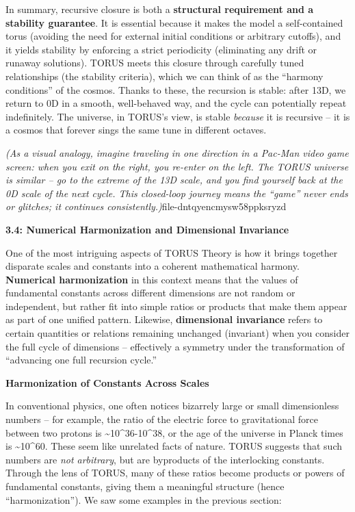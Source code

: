 \documentclass[
]{article}
\begin{document}
In summary, recursive closure is both a \textbf{structural requirement
and a stability guarantee}. It is essential because it makes the model a
self-contained torus (avoiding the need for external initial conditions
or arbitrary cutoffs), and it yields stability by enforcing a strict
periodicity (eliminating any drift or runaway solutions). TORUS meets
this closure through carefully tuned relationships (the stability
criteria), which we can think of as the ``harmony conditions'' of the
cosmos. Thanks to these, the recursion is stable: after 13D, we return
to 0D in a smooth, well-behaved way, and the cycle can potentially
repeat indefinitely. The universe, in TORUS's view, is stable
\emph{because} it is recursive -- it is a cosmos that forever sings the
same tune in different octaves.

\emph{(As a visual analogy, imagine traveling in one direction in a
Pac-Man video game screen: when you exit on the right, you re-enter on
the left. The TORUS universe is similar -- go to the extreme of the 13D
scale, and you find yourself back at the 0D scale of the next cycle.
This closed-loop journey means the ``game'' never ends or glitches; it
continues consistently.)}\hspace{0pt}file-dntqyencmysw58ppksryzd

\textbf{3.4: Numerical Harmonization and Dimensional Invariance}

One of the most intriguing aspects of TORUS Theory is how it brings
together disparate scales and constants into a coherent mathematical
harmony. \textbf{Numerical harmonization} in this context means that the
values of fundamental constants across different dimensions are not
random or independent, but rather fit into simple ratios or products
that make them appear as part of one unified pattern. Likewise,
\textbf{dimensional invariance} refers to certain quantities or
relations remaining unchanged (invariant) when you consider the full
cycle of dimensions -- effectively a symmetry under the transformation
of ``advancing one full recursion cycle.''

\textbf{Harmonization of Constants Across Scales}

In conventional physics, one often notices bizarrely large or small
dimensionless numbers -- for example, the ratio of the electric force to
gravitational force between two protons is
\textasciitilde10\^{}36-10\^{}38, or the age of the universe in Planck
times is \textasciitilde10\^{}60. These seem like unrelated facts of
nature. TORUS suggests that such numbers are \emph{not arbitrary}, but
are byproducts of the interlocking constants. Through the lens of TORUS,
many of these ratios become products or powers of fundamental constants,
giving them a meaningful structure (hence ``harmonization''). We saw
some examples in the previous section:
\end{document}
